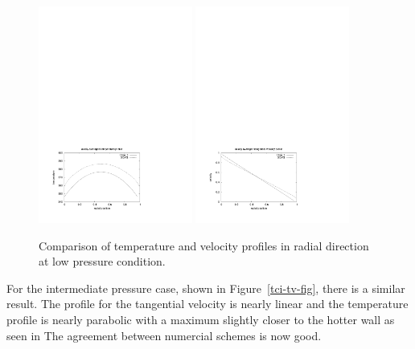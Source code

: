 \begin{figure}[htbp]
\begin{center}
\includegraphics[width=0.45\textwidth,viewport=41 46 411 298,clip=true]{../3D/taylor-couette/temperature-low.pdf}
\includegraphics[width=0.45\textwidth,viewport=41 50 407 303,clip=true]{../3D/taylor-couette/velocity-low.pdf}
\end{center}
\caption{Comparison of temperature and velocity profiles in radial direction at low pressure condition.}
\label{tcl-tv-fig}
\end{figure}

\medskip
For the intermediate pressure case, shown in Figure~\ref{tci-tv-fig}, there is a similar result. 
The profile for the tangential velocity is nearly linear
and the temperature profile is nearly parabolic with a maximum slightly closer to the hotter wall as seen in
The agreement between numercial schemes is now good.

